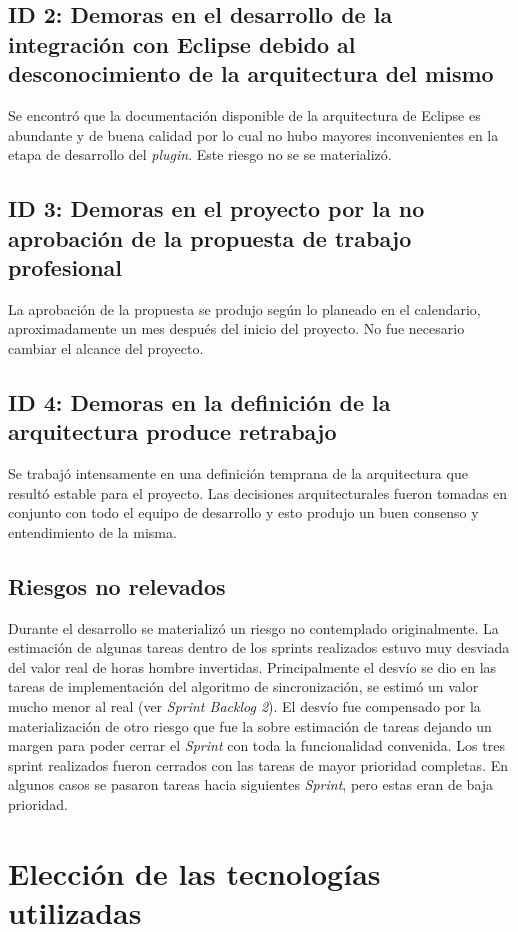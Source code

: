\documentclass[12pt,a4paper]{article}
\begin{document}
\subsection{ID 2: Demoras en el desarrollo de la integración con Eclipse debido al desconocimiento de la 
arquitectura del mismo}
Se encontró que la documentación disponible de la arquitectura de Eclipse es abundante y de buena calidad por
lo cual no hubo mayores inconvenientes en la etapa de desarrollo del \textit{plugin}. Este riesgo no se se
materializó.

\subsection{ID 3: Demoras en el proyecto por la no aprobación de la propuesta de trabajo profesional}
La aprobación de la propuesta se produjo según lo planeado en el calendario, aproximadamente un mes después del
inicio del proyecto. No fue necesario cambiar el alcance del proyecto.

\subsection{ID 4: Demoras en la definición de la arquitectura produce retrabajo}
Se trabajó intensamente en una definición temprana de la arquitectura que resultó estable para el proyecto. Las
decisiones arquitecturales fueron tomadas en conjunto con todo el equipo de desarrollo y esto produjo un buen
consenso y entendimiento de la misma.

\subsection{Riesgos no relevados}
Durante el desarrollo se materializó un riesgo no contemplado originalmente. La estimación de algunas tareas dentro
de los sprints realizados estuvo muy desviada del valor real de horas hombre invertidas. Principalmente el desvío se
dio en las tareas de implementación del algoritmo de sincronización, se estimó un valor mucho menor al real (ver
\textit{Sprint Backlog 2}). El desvío fue compensado por la materialización de otro riesgo que fue la sobre estimación
de tareas dejando un margen para poder cerrar el \textit{Sprint} con toda la funcionalidad convenida.
Los tres sprint realizados fueron cerrados con las tareas de mayor prioridad completas. En algunos casos se pasaron 
tareas hacia siguientes \textit{Sprint}, pero estas eran de baja prioridad.

\section{Elección de las tecnologías utilizadas}
\end{document}

